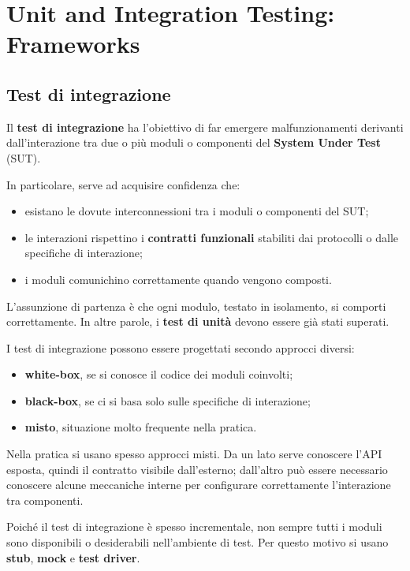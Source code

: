 \chapter{Unit and Integration Testing: Frameworks}

\section{Test di integrazione}

Il \textbf{test di integrazione} ha l'obiettivo di far emergere malfunzionamenti derivanti dall'interazione tra due o più moduli o componenti del \textbf{System Under Test} (SUT).

In particolare, serve ad acquisire confidenza che:

\begin{itemize}
    \item esistano le dovute interconnessioni tra i moduli o componenti del SUT;
    \item le interazioni rispettino i \textbf{contratti funzionali} stabiliti dai protocolli o dalle specifiche di interazione;
    \item i moduli comunichino correttamente quando vengono composti.
\end{itemize}

L'assunzione di partenza è che ogni modulo, testato in isolamento, si comporti correttamente. In altre parole, i \textbf{test di unità} devono essere già stati superati.

I test di integrazione possono essere progettati secondo approcci diversi:

\begin{itemize}
    \item \textbf{white-box}, se si conosce il codice dei moduli coinvolti;
    \item \textbf{black-box}, se ci si basa solo sulle specifiche di interazione;
    \item \textbf{misto}, situazione molto frequente nella pratica.
\end{itemize}

\begin{notaprof}
Nella pratica si usano spesso approcci misti. Da un lato serve conoscere l'API esposta, quindi il contratto visibile dall'esterno; dall'altro può essere necessario conoscere alcune meccaniche interne per configurare correttamente l'interazione tra componenti.
\end{notaprof}


Poiché il test di integrazione è spesso incrementale, non sempre tutti i moduli sono disponibili o desiderabili nell'ambiente di test. Per questo motivo si usano \textbf{stub}, \textbf{mock} e \textbf{test driver}.

